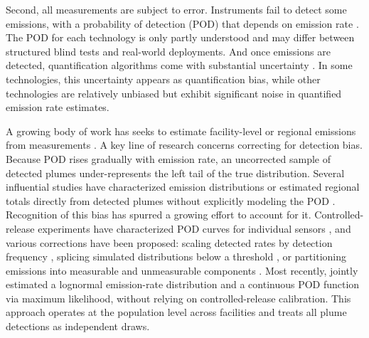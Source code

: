 \documentclass[unnumsec,webpdf,modern,mediumone]{oup-authoring-template}
\begin{document}
Second, all measurements are subject to error. Instruments fail to detect some emissions, with a probability of detection (POD) that depends on emission rate \citep{Sherwin2021, Sherwin2023}. The POD for each technology is only partly understood and may differ between structured blind tests and real-world deployments. And once emissions are detected, quantification algorithms come with substantial uncertainty \citep{Sherwin2023, Wigle2024}. In some technologies, this uncertainty appears as quantification bias, while other technologies are relatively unbiased but exhibit significant noise in quantified emission rate estimates.


A growing body of work has seeks to estimate facility-level or regional emissions from measurements \citep{Sherwin2024Nature, Jervis2025Science, Johnson2023CommEE, Cusworth2021}. A key line of research concerns correcting for detection bias. Because POD rises gradually with emission rate, an uncorrected sample of detected plumes under-represents the left tail of the true distribution. Several influential studies have characterized emission distributions or estimated regional totals directly from detected plumes without explicitly modeling the POD \citep{Lauvaux2022, Ehret2022, Frankenberg2016}. Recognition of this bias has spurred a growing effort to account for it. Controlled-release experiments have characterized POD curves for individual sensors \citep{Sherwin2021, Bell2022, Conrad2023, ElAbbadi2024, GHGSatMATM2025}, and various corrections have been proposed: scaling detected rates by detection frequency \citep{Jervis2025Science}, splicing simulated distributions below a threshold \citep{Sherwin2024Nature}, or partitioning emissions into measurable and unmeasurable components \citep{Johnson2023CommEE}. Most recently, \citet{JervisPreprint2025} jointly estimated a lognormal emission-rate distribution and a continuous POD function via maximum likelihood, without relying on controlled-release calibration. This approach operates at the population level across facilities and treats all plume detections as independent draws.
\end{document}
